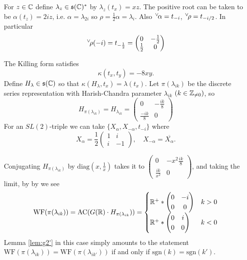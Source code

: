 \documentclass{article}
\theoremstyle{definition}
\numberwithin{equation}{section}
\renewcommand{\-}{\hyp{}}
\newcommand{\s}{\mathfrak s}
\newcommand{\WF}{\mathrm{WF}}
\newcommand{\AC}{\mathrm{AC}}
\newcommand{\ch}[1]{\negthinspace\negthinspace\negthinspace\phantom{a}^\vee\negthinspace #1}
\begin{document}
For $z\in \mathbb{C}$ define $\lambda_z\in \s(\C)^*$ by $\lambda_z(t_x)=xz$.
The positive root can be taken to be   $\alpha(t_z)=2iz$, i.e.
$\alpha=\lambda_{2i}$ so $\rho=\frac12\alpha=\lambda_i$. Also  $\ch\alpha=t_{-i}$, $\ch\rho=t_{-i/2}$.
In particular
$$
\ch\rho(-i)=t_{-\frac 12}=\begin{pmatrix}0&-\frac 12\\\frac 12&0
\end{pmatrix}
$$

The Killing form satisfies
$$
\kappa(t_x,t_y)=-8xy.
$$
Define $H_{\lambda}\in \s(\C)$ so that $\kappa(H_\lambda,t_x)=\lambda(t_x)$.
Let $\pi(\lambda_{ik})$ be the discrete series representation with Harish-Chandra parameter $\lambda_{ik}$ $(k\in \mathbb{Z}_{\ne 0})$, so
$$
H_{\pi(\lambda_{ik})}=H_{\lambda_{ik}}=
\begin{pmatrix}0&-\frac{ik}8\\\frac{-ik}8&0
\end{pmatrix}
$$
For an $SL(2)$-triple we can take $\{X_\alpha,X_{-\alpha},t_{-i}\}$ where
$$
X_\alpha=\frac12\begin{pmatrix}1&i\\i&-1
\end{pmatrix}, \quad X_{-\alpha}=\overline{X_\alpha}.
$$



Conjugating $H_{\pi(\lambda_{ik})}$ by $\mathrm{diag}(x,\frac 1x)$ takes it to
$\begin{pmatrix}0&-x^2\frac{ik}8\\\frac{ik}{x^2}&0
\end{pmatrix}$,
and taking the limit, by  by \cite[Theorem 1.2]{harris} we see
$$
\WF(\pi(\lambda_{ik}))=\AC(G(\R)\cdot H_{\pi(\lambda_{ik}}))=
\begin{cases}
  \R^+*\begin{pmatrix}0&-i\\0&0
  \end{pmatrix}&k>0\\
    \R^+*\begin{pmatrix}0&i\\0&0
  \end{pmatrix}&k<0\\
  \end{cases}
$$
Lemma \ref{lem:g2'} in this case simply amounts to the statement $\WF(\pi(\lambda_{ik}))=\WF(\pi(\lambda_{ik'}))$ if and only if $\mathrm{sgn}(k)=\mathrm{sgn}(k')$.
\end{document}
